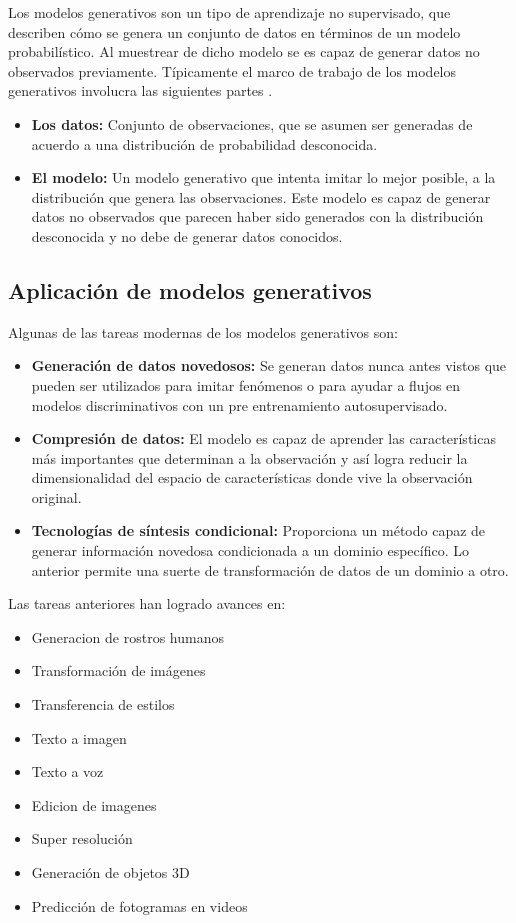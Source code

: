 Los modelos generativos son un tipo de aprendizaje no supervisado, que describen cómo se genera un conjunto de datos en términos de un modelo probabilístico. Al muestrear de dicho modelo se es capaz de generar datos no observados previamente. Típicamente el marco de trabajo de los modelos generativos involucra las siguientes partes \parencite{FosterGM2019}.

\begin{itemize}
    \item \textbf{Los datos:} Conjunto de observaciones, que se asumen ser generadas de acuerdo a una distribución de probabilidad desconocida.
    \item \textbf{El modelo:} Un modelo generativo que intenta imitar lo mejor posible, a la distribución que genera las observaciones. Este modelo es capaz de generar datos no observados que parecen haber sido generados con la distribución desconocida y no debe de generar datos conocidos.
\end{itemize}

\subsection{Aplicación de modelos generativos}

Algunas de las tareas modernas de los modelos generativos son:

\begin{itemize}
    \item \textbf{Generación de datos novedosos:} Se generan datos nunca antes vistos que pueden ser utilizados para imitar fenómenos o para ayudar a flujos en modelos discriminativos con un pre entrenamiento autosupervisado.
    \item \textbf{Compresión de datos:} El modelo es capaz de aprender las características más importantes que determinan a la observación y así logra reducir la dimensionalidad del espacio de características donde vive la observación original. 
    \item \textbf{Tecnologías de síntesis condicional:} Proporciona un método capaz de generar información novedosa condicionada a un dominio específico. Lo anterior permite una suerte de transformación de datos de un dominio a otro. 
\end{itemize}

Las tareas anteriores han logrado avances en:

\begin{itemize}
    \item Generacion de rostros humanos
    \item Transformación de imágenes
    \item Transferencia de estilos
    \item Texto a imagen
    \item Texto a voz
    \item Edicion de imagenes
    \item Super resolución
    \item Generación de objetos 3D
    \item Predicción de fotogramas en videos
\end{itemize}
